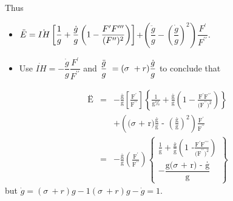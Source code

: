 \documentclass[12pt,compress,handout]{beamer}  %
\begin{document}
\begin{frame}

Thus
\begin{itemize}[<+->]
\item $\ddot{E}= \dot{IH}\left[ \dfrac{1}{g}+\dfrac{\dot{g}}{g}\left(1-
\dfrac{F^{\prime }F^{\prime \prime \prime }}{(F^{\prime \prime })^{%
\text{2}}}\right)\right] $+$\left( \dfrac{\ddot{g}}{g}-\left( \dfrac{\dot{g}}{g}%
\right) ^{2}\right) \dfrac{F^{\prime }}{F^{\prime \prime }}.$\vspace{.3in}
\item Use
$\dot{IH} = -\dfrac{\dot{g}}{g}\dfrac{F^{\prime }}{F^{\prime \prime }}$ and $\dfrac{%
\ddot{g}}{g}\ =(\sigma \ +r)\dfrac{\dot{g}}{g}$ to conclude that
\end{itemize}
\end{frame}


\begin{frame}
\begin{eqnarray*}
\text{\"{E}} &=&-\frac{\text{\.{g}}}{\text{g}}\left[ \frac{\text{F}%
^{\prime }}{\text{F}^{\prime \prime }}\right] \left\{ \frac{\text{1}}{\text{g%
}}+\frac{\text{\.{g}}}{\text{g}}\left( \text{1}-\frac{\text{F}^{\prime }%
\text{F}^{\prime \prime }}{\text{(F}^{\prime \prime }\text{)}^{\text{2}}}%
\right) \right\} \\
&&+\left( (\sigma \text{ + r)}\frac{\text{\.{g}}}{\text{g}}\text{ - }\left(
\frac{\text{\.{g}}}{\text{g}}\right) ^{\text{2}}\right) \frac{\text{F}%
^{\prime }}{\text{F}^{\prime \prime }} \\
&=&-\frac{\text{\.{g}}}{\text{g}}\left( \frac{\text{F}^{\prime }}{\text{F}%
^{\prime \prime }}\right) \left\{
\begin{array}{c}
\frac{\text{1}}{\text{g}}+\frac{\text{\.{g}}}{\text{g}}\left( \text{1 -}%
\frac{\text{F}^{\prime }\text{F}^{\prime \prime \prime }}{\text{(F}^{\prime
\prime }\text{)}^{\text{2}}}\right) \\
-\dfrac{\text{g(}\sigma \text{ + r) - \.{g}}}{\text{g}}
\end{array}
\right\}
\end{eqnarray*}
\baselineskip=60pt but $\dot{g}=(\sigma \ +r)g-1$\qquad $(\sigma \ +r)g-\dot{g%
}=1$.
\end{frame}
\end{document}
